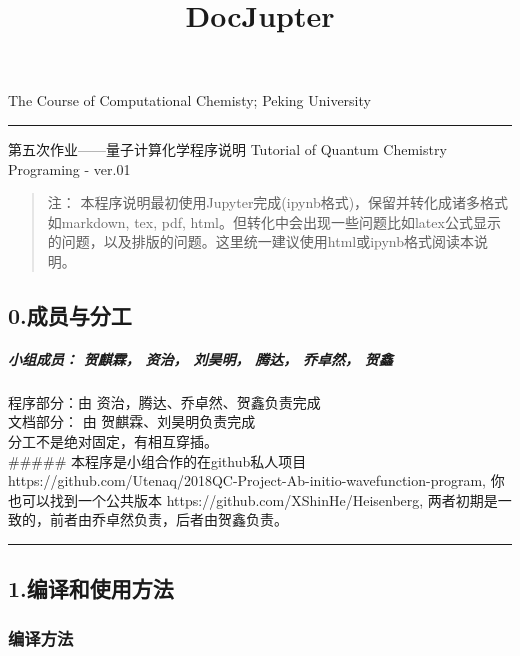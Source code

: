 \documentclass[11pt]{article}
\title{DocJupter}
\begin{document}
    
    
    \maketitle
    
    

    
    The Course of Computational Chemisty; Peking University

\begin{center}\rule{0.5\linewidth}{\linethickness}\end{center}

第五次作业------量子计算化学程序说明 Tutorial of Quantum Chemistry
Programing - ver.01

\begin{quote}
注：
本程序说明最初使用Jupyter完成(ipynb格式)，保留并转化成诸多格式如markdown,
tex, pdf,
html。但转化中会出现一些问题比如latex公式显示的问题，以及排版的问题。这里统一建议使用html或ipynb格式阅读本说明。
\end{quote}

    \subsection{0.成员与分工}\label{ux6210ux5458ux4e0eux5206ux5de5}

\subparagraph{小组成员： 贺麒霖， 资治， 刘昊明， 腾达， 乔卓然，
贺鑫}\label{ux5c0fux7ec4ux6210ux5458-ux8d3aux9e92ux9716-ux8d44ux6cbb-ux5218ux660aux660e-ux817eux8fbe-ux4e54ux5353ux7136-ux8d3aux946b}

程序部分：由 资治，腾达、乔卓然、贺鑫负责完成\\
文档部分： 由 贺麒霖、刘昊明负责完成\\
分工不是绝对固定，有相互穿插。\\
\#\#\#\#\# 本程序是小组合作的在github私人项目
https://github.com/Utenaq/2018QC-Project-Ab-initio-wavefunction-program,
你也可以找到一个公共版本 https://github.com/XShinHe/Heisenberg,
两者初期是一致的，前者由乔卓然负责，后者由贺鑫负责。

\begin{center}\rule{0.5\linewidth}{\linethickness}\end{center}

    \subsection{1.编译和使用方法}\label{ux7f16ux8bd1ux548cux4f7fux7528ux65b9ux6cd5}

\subsubsection{编译方法}\label{ux7f16ux8bd1ux65b9ux6cd5}
\end{document}
